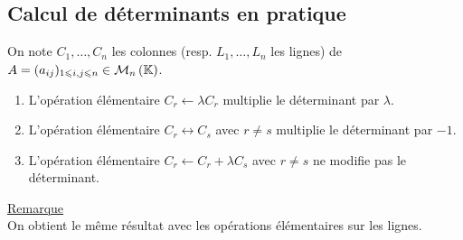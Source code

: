 \subsection{Calcul de déterminants en pratique}
    On note \(C_1, \dots  , C_n\) les colonnes (resp. \(L_1, \dots  , L_n\) les lignes) de \(A = (a_{ij} )_{1\leq i,j\leq n} \in  \M{n}\).
\begin{defprop}
    \begin{enumerate}
        \item L’opération élémentaire \(C_r \leftarrow \lambda C_r\) multiplie le déterminant par \(\lambda\).
        \item L’opération élémentaire \(C_r \leftrightarrow C_s\) avec \(r\neq s\) multiplie le déterminant par \(-1\).
        \item L’opération élémentaire \(C_r \leftarrow C_r + \lambda C_s\) avec \(r\neq s\) ne modifie pas le déterminant.
    \end{enumerate}
    \underline{Remarque}\\
    On obtient le même résultat avec les opérations élémentaires sur les lignes.
\end{defprop}

